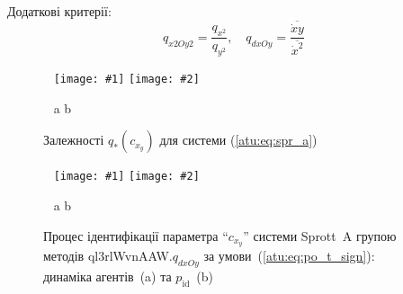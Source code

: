 \documentclass[14pt,handout,utf8]{beamer}
\newcommand{\ABlbl}{%
  \vspace{-2.7ex}
  \begin{center}
    ~ \hfill a \hfill\hfill b \hfill ~
  \end{center}
  \vspace{-2.0ex}
}
\newcommand{\PicDouble}[2]{%
 \begin{center}
    ~ \hfill
    \texttt{[image: \#1]}
    \hfill
    \texttt{[image: \#2]}
    \hfill ~
  \end{center}
  \ABlbl
}
\begin{document}
\begin{frame}
  \frametitle{~}

  Додаткові критерії:
  \[
    q_{x2Oy2} = \frac{q_{x^2}}{q_{y^2}},
    \quad
    q_{dxOy} =
    \frac{\overline{\dot{x}y}}{\overline{\dot{x}^2}}
  \]

\begin{figure}
  \PicDouble{../p5/p/cha/spr_a/sprott_a_q-p_c_x_y.png}{../p5/p/cha/spr_a/sprott_a_q2-p_c_x_y2.png}
  \caption{Залежності $q_{*}(c_{x_y})$ для системи (\ref{atu:eq:spr_a})}
  \label{atu:f:spr_a_q}
\end{figure}

  \begin{figure}[htb!]
    \PicDouble{../p5/p/cha/spr_a/ql3rlWvnAAW_dxOy/sprott_a_id2-p_t_pi_ql3rlWvnAAW_sign.png}{../p5/p/cha/spr_a/ql3rlWvnAAW_dxOy/sprott_a_id2-p_t_p_ql3rlWvnAAW_sign.png}
    \caption{Процес ідентифікації параметра ``$c_{x_y}$'' системи Sprott~A групою методів ql3rlWvnAAW.$q_{dxOy}$ за умови~(\ref{atu:eq:po_t_sign}): динаміка агентів~(a) та $p_\mathrm{id}$~(b)}
    \label{atu:f:spr_a_id_ql3rlWvnAAW_q_dxOy_sign}
  \end{figure}


\end{frame}







\end{document}
